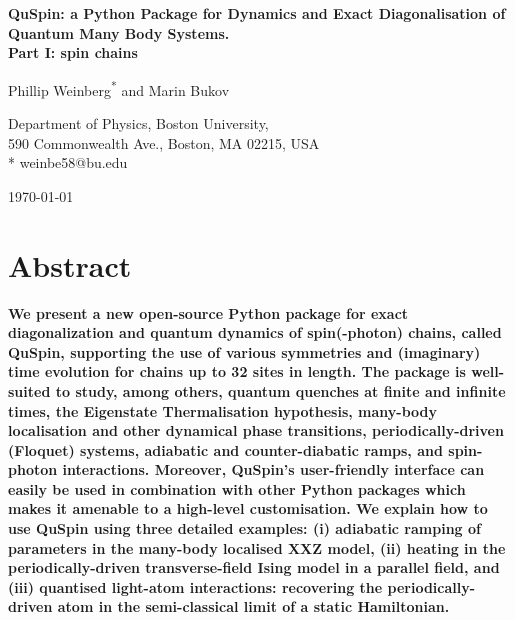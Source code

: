 \documentclass{SciPost}
\newcommand\0{\scalebox{-1}[1]{0}}
\begin{document}
\begin{center}{\Large \textbf{
QuSpin: a Python Package for Dynamics and Exact Diagonalisation of Quantum Many Body Systems.\\
\large Part I: spin chains
}}\end{center}

\begin{center}
Phillip Weinberg\textsuperscript{*} and Marin Bukov
\end{center}

\begin{center}
Department of Physics, Boston University, \\
590 Commonwealth Ave., Boston, MA 02215, USA
\\
* weinbe58@bu.edu
\end{center}

\begin{center}
\today
\end{center}


\section*{Abstract}
{\bf 
We present a new open-source Python package for exact diagonalization and quantum dynamics of spin(-photon) chains, called QuSpin, supporting the use of various symmetries and (imaginary) time evolution for chains up to 32 sites in length. The package is well-suited to study, among others, quantum quenches at finite and infinite times, the Eigenstate Thermalisation hypothesis, many-body localisation and other dynamical phase transitions, periodically-driven (Floquet) systems, adiabatic and counter-diabatic ramps, and spin-photon interactions. Moreover, QuSpin's user-friendly interface can easily be used in combination with other Python packages which makes it amenable to a high-level customisation. We explain how to use QuSpin using three detailed examples: (i) adiabatic ramping of parameters in the many-body localised XXZ model, (ii) heating in the periodically-driven transverse-field Ising model in a parallel field, and (iii) quantised light-atom interactions: recovering the periodically-driven atom in the semi-classical limit of a static Hamiltonian.
}
\end{document}
